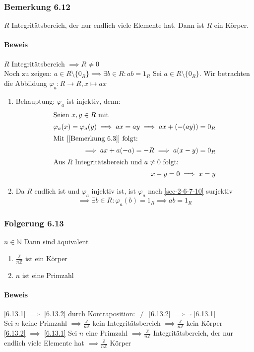 \documentclass[a4paper]{scrartcl}
\theoremstyle{definition}
\theoremstyle{plain}
\theoremstyle{plain}
\theoremstyle{remark}
\theoremstyle{remark}
\theoremstyle{remark}
\theoremstyle{remark}
\theoremstyle{remark}
\begin{document}
\subsubsection{Bemerkung 6.12}
\label{sec-3-3-3}
$R$ Integritätsbereich, der nur endlich viele Elemente hat. Dann ist $R$ ein Körper.
\paragraph{Beweis}
\label{sec-3-3-3-1}
$R$ Integritätsbereich $\implies R\neq 0$ \\
     Noch zu zeigen: $a\in R\setminus\{0_R\} \implies \exists b\in R: a b = 1_R$
Sei $a\in R\setminus\{0_R\}$. Wir betrachten die Abbildung $\varphi_a: R\to R,x\mapsto a x$
\begin{enumerate}
\item Behauptung: $\varphi_a$ ist injektiv, denn:
\begin{align}
\intertext{Seien $x,y\in R$ mit}
\varphi_a(x) =\varphi_a(y) \implies a x = a y \implies a x + (-(a y)) = 0_R \\
\intertext{Mit [[Bemerkung 6.3]] folgt:}
\implies a x + a(-a) = -R \implies a(x - y) = 0_R  \\
\intertext{Aus $R$ Integritätsbereich und $a\neq 0$ folgt:}
x - y = 0 \implies x = y
\end{align}
\item Da $R$ endlich ist und $\varphi_a$ injektiv ist, ist $\varphi_a$ nach \ref{sec-2-6-7-10} surjektiv
\[\implies  \exists b\in R: \varphi_a(b) = 1_R \implies a b = 1_R\]
\end{enumerate}
\subsubsection{Folgerung 6.13}
\label{sec-3-3-4}
$n\in\mathbb{N}$ Dann sind äquivalent
\begin{enumerate}
\item \label{6.13.1} $\frac{\mathbb{Z}}{n\mathbb{Z}}$ ist ein Körper
\item \label{6.13.2} $n$ ist eine Primzahl
\end{enumerate}
\paragraph{Beweis}
\label{sec-3-3-4-1}
\ref{6.13.1} $\implies$ \ref{6.13.2} durch Kontraposition: $\neq$ \ref{6.13.2} $\implies \neg$ \ref{6.13.1} \\
     Sei $n$ keine Primzahl $\implies \frac{\mathbb{Z}}{n\mathbb{Z}}$ kein Integritätsbereich $\implies \frac{\mathbb{Z}}{n\mathbb{Z}}$ kein Körper \\
     \ref{6.13.2} $\implies$ \ref{6.13.1} Sei $n$ eine Primzahl $\implies \frac{\mathbb{Z}}{n\mathbb{Z}}$ Integritätsbereich, der nur endlich viele Elemente hat $\implies \frac{\mathbb{Z}}{n\mathbb{Z}}$ Körper
\end{document}
